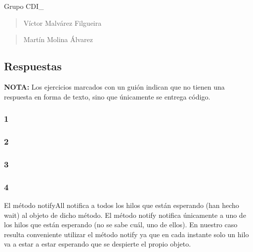 Grupo C\-D\-I\-\_

\begin{quotation}
Víctor Malvárez Filgueira

\end{quotation}


\begin{quotation}
Martín Molina Álvarez

\end{quotation}


\subsection*{Respuestas}

{\bfseries N\-O\-T\-A\-:} Los ejercicios marcados con un guión indican que no tienen una respuesta en forma de texto, sino que únicamente se entrega código.

\subsubsection*{1}


\begin{DoxyItemize}
\item \subsubsection*{2}
\end{DoxyItemize}


\begin{DoxyItemize}
\item \subsubsection*{3}
\end{DoxyItemize}


\begin{DoxyItemize}
\item \subsubsection*{4}
\end{DoxyItemize}

El método {\ttfamily notify\-All} notifica a todos los hilos que están esperando (han hecho {\ttfamily wait}) al objeto de dicho método. El método {\ttfamily notify} notifica únicamente a uno de los hilos que están esperando (no se sabe cuál, uno de ellos). En nuestro caso resulta conveniente utilizar el método {\ttfamily notify} ya que en cada instante solo un hilo va a estar a estar esperando que se despierte el propio objeto.

